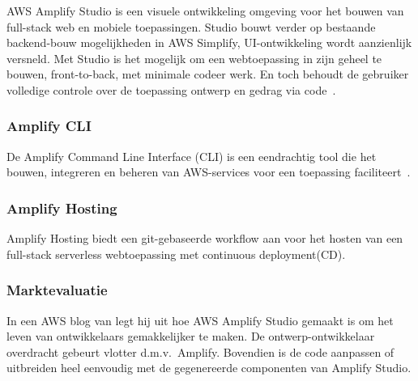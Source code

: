 AWS Amplify Studio is een visuele ontwikkeling omgeving voor het bouwen van full-stack web en mobiele toepassingen.
Studio bouwt verder op bestaande backend-bouw mogelijkheden in AWS Simplify, UI-ontwikkeling wordt aanzienlijk versneld.
Met Studio is het mogelijk om een webtoepassing in zijn geheel te bouwen, front-to-back, met minimale codeer werk.
En toch behoudt de gebruiker volledige controle over de toepassing ontwerp en gedrag via code~\autocite{AWSAmplifyDocs}.

\subsubsection{Amplify CLI}

De Amplify Command Line Interface (CLI) is een eendrachtig tool die het bouwen, integreren en beheren van AWS-services voor een toepassing faciliteert~\autocite{AWSAmplifyDocs}.

\subsubsection{Amplify Hosting}


Amplify Hosting biedt een git-gebaseerde workflow aan voor het hosten van een full-stack serverless webtoepassing met continuous deployment(CD).

\subsubsection{Marktevaluatie}


In een AWS blog van \textcite{Spittel2022} legt hij uit hoe AWS Amplify Studio gemaakt is om het leven van ontwikkelaars gemakkelijker te maken.
De ontwerp-ontwikkelaar overdracht gebeurt vlotter d.m.v.\ Amplify.
Bovendien is de code aanpassen of uitbreiden heel eenvoudig met de gegenereerde componenten van Amplify Studio.

